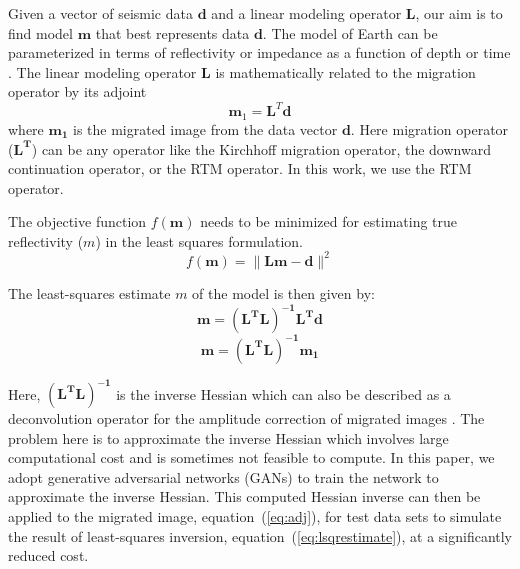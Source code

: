 Given a vector of seismic data $\mathbf d$ and a linear modeling operator $\mathbf L$, our aim is to find model $\mathbf m$ that best represents data $\mathbf d$. The model of Earth can be parameterized in terms of reflectivity or impedance as a function of depth or time \cite[]{guitton2004amplitude,guitton2017fast}. The linear modeling operator $\mathbf L$ is mathematically related to the migration operator by its adjoint \cite[]{claerbout1985imaging,guitton2004amplitude}  
\begin{equation}
\mathbf m_1=\mathbf L^T \mathbf d
\label{eq:adj}
\end{equation}
where $\mathbf{m_1}$ is the migrated image from the data vector $\mathbf d$. Here migration operator ($\mathbf {L^T}$) can be any operator like the Kirchhoff migration operator, the downward continuation operator, or the RTM operator. In this work, we use the RTM operator. 

The objective function $f(\mathbf m)$ needs to be minimized for estimating true reflectivity ($m$) in the least squares formulation.
\begin{equation}
f(\mathbf m)=\parallel \mathbf {Lm}-\mathbf d \parallel^2
\label{eq:objective}
\end{equation}

The least-squares estimate $m$ of the model is then given by:
\begin{equation}
\mathbf m=\mathbf{(L^TL)^{-1}L^Td}
\label{eq:lsqrestimate}
\end{equation}
\begin{equation}
\mathbf m=\mathbf{(L^TL)^{-1}m_1}
\label{eq:refmig}
\end{equation}

Here, $\mathbf {(L^TL)^{-1}}$ is the inverse Hessian which can also be described as a deconvolution operator for the amplitude correction of migrated images \cite[]{hu2001poststack}. The problem here is to approximate the inverse Hessian which involves large computational cost and is sometimes not feasible to compute. In this paper, we adopt generative adversarial networks (GANs) to train the network to approximate the inverse Hessian. This computed Hessian inverse can then be applied to the migrated image, equation~(\ref{eq:adj}), for test data sets to simulate the result of least-squares inversion, equation~(\ref{eq:lsqrestimate}), at a significantly reduced cost. 

